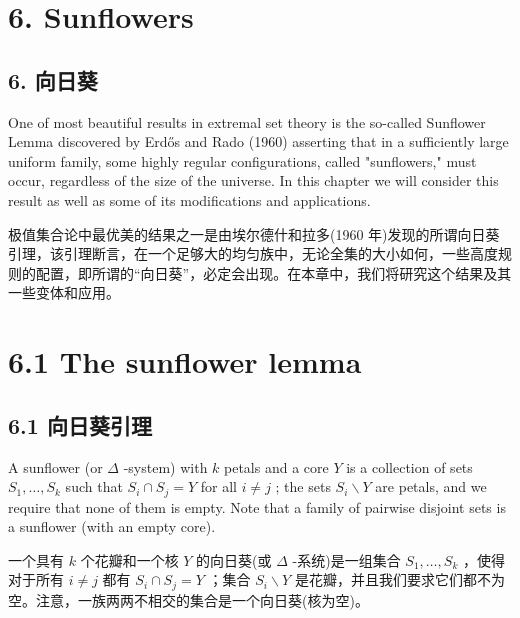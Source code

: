 \documentclass[10pt]{article}
\begin{document}
\section*{6. Sunflowers}

\begin{tcolorbox}\relax
\section*{6. 向日葵}
\end{tcolorbox}

One of most beautiful results in extremal set theory is the so-called Sunflower Lemma discovered by Erdős and Rado (1960) asserting that in a sufficiently large uniform family, some highly regular configurations, called "sunflowers," must occur, regardless of the size of the universe. In this chapter we will consider this result as well as some of its modifications and applications.

\begin{tcolorbox}\relax
极值集合论中最优美的结果之一是由埃尔德什和拉多(1960 年)发现的所谓向日葵引理，该引理断言，在一个足够大的均匀族中，无论全集的大小如何，一些高度规则的配置，即所谓的“向日葵”，必定会出现。在本章中，我们将研究这个结果及其一些变体和应用。
\end{tcolorbox}

\section*{6.1 The sunflower lemma}

\begin{tcolorbox}\relax
\section*{6.1 向日葵引理}
\end{tcolorbox}

A sunflower (or \(\Delta\) -system) with \(k\) petals and a core \(Y\) is a collection of sets \({S}_{1},\ldots ,{S}_{k}\) such that \({S}_{i} \cap  {S}_{j} = Y\) for all \(i \neq  j\) ; the sets \({S}_{i} \smallsetminus  Y\) are petals, and we require that none of them is empty. Note that a family of pairwise disjoint sets is a sunflower (with an empty core).

\begin{tcolorbox}\relax
一个具有 \(k\) 个花瓣和一个核 \(Y\) 的向日葵(或 \(\Delta\) -系统)是一组集合 \({S}_{1},\ldots ,{S}_{k}\) ，使得对于所有 \(i \neq  j\) 都有 \({S}_{i} \cap  {S}_{j} = Y\) ；集合 \({S}_{i} \smallsetminus  Y\) 是花瓣，并且我们要求它们都不为空。注意，一族两两不相交的集合是一个向日葵(核为空)。
\end{tcolorbox}
\end{document}
